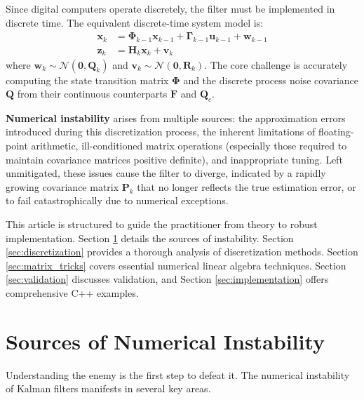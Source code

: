 \documentclass[11pt]{article}
\begin{document}
Since digital computers operate discretely, the filter must be implemented in discrete time. The equivalent discrete-time system model is:
\begin{align}
\bm{x}_{k} &= \bm{\Phi}_{k-1} \bm{x}_{k-1} + \bm{\Gamma}_{k-1} \bm{u}_{k-1} + \bm{w}_{k-1} \label{eq:disc_sys}\\
\bm{z}_{k} &= \bm{H}_{k} \bm{x}_{k} + \bm{v}_{k} \label{eq:disc_meas}
\end{align}
where $\bm{w}_{k} \sim \mathcal{N}(\bm{0}, \bm{Q}_k)$ and $\bm{v}_{k} \sim \mathcal{N}(\bm{0}, \bm{R}_k)$. The core challenge is accurately computing the state transition matrix $\bm{\Phi}$ and the discrete process noise covariance $\bm{Q}$ from their continuous counterparts $\bm{F}$ and $\bm{Q}_c$.

\textbf{Numerical instability} arises from multiple sources: the approximation errors introduced during this discretization process, the inherent limitations of floating-point arithmetic, ill-conditioned matrix operations (especially those required to maintain covariance matrices positive definite), and inappropriate tuning. Left unmitigated, these issues cause the filter to diverge, indicated by a rapidly growing covariance matrix $\bm{P}_k$ that no longer reflects the true estimation error, or to fail catastrophically due to numerical exceptions.

This article is structured to guide the practitioner from theory to robust implementation. Section \ref{sec:sources} details the sources of instability. Section \ref{sec:discretization} provides a thorough analysis of discretization methods. Section \ref{sec:matrix_tricks} covers essential numerical linear algebra techniques. Section \ref{sec:validation} discusses validation, and Section \ref{sec:implementation} offers comprehensive C++ examples.

\section{Sources of Numerical Instability}
\label{sec:sources}
Understanding the enemy is the first step to defeat it. The numerical instability of Kalman filters manifests in several key areas.
\end{document}
